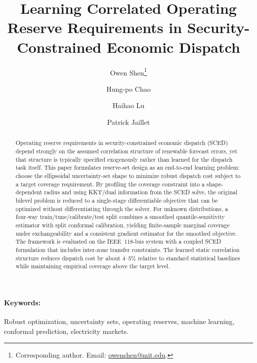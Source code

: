 \documentclass[11pt]{article}
\theoremstyle{definition}
\begin{document}
\title{Learning Correlated Operating Reserve Requirements in Security-Constrained Economic Dispatch}

\author[1]{Owen Shen\thanks{Corresponding author. Email: \href{mailto:owenshen@mit.edu}{owenshen@mit.edu}.}}
\author[2]{Hung-po Chao}
\author[1]{Haihao Lu}
\author[1]{Patrick Jaillet}


\date{}

\maketitle

\begin{abstract}
Operating reserve requirements in security-constrained economic dispatch (SCED) depend strongly on the assumed correlation structure of renewable forecast errors, yet that structure is typically specified exogenously rather than learned for the dispatch task itself. This paper formulates reserve-set design as an end-to-end learning problem: choose the ellipsoidal uncertainty-set shape to minimize robust dispatch cost subject to a target coverage requirement. By profiling the coverage constraint into a shape-dependent radius and using KKT/dual information from the SCED solve, the original bilevel problem is reduced to a single-stage differentiable objective that can be optimized without differentiating through the solver. For unknown distributions, a four-way train/tune/calibrate/test split combines a smoothed quantile-sensitivity estimator with split conformal calibration, yielding finite-sample marginal coverage under exchangeability and a consistent gradient estimator for the smoothed objective. The framework is evaluated on the IEEE~118-bus system with a coupled SCED formulation that includes inter-zone transfer constraints. The learned static correlation structure reduces dispatch cost by about 4--5\% relative to standard statistical baselines while maintaining empirical coverage above the target level.
\end{abstract}

\paragraph{Keywords:} Robust optimization, uncertainty sets, operating reserves, machine learning, conformal prediction, electricity markets.
\end{document}
